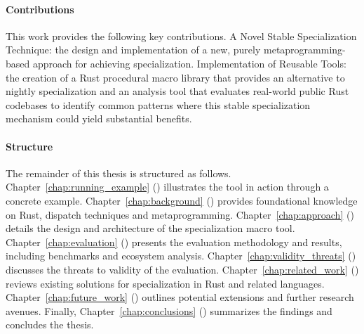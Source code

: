 \paragraph{Contributions}
This work provides the following key contributions.
A Novel Stable Specialization Technique: the design and implementation of a new, purely metaprogramming-based approach for achieving specialization.
Implementation of Reusable Tools: the creation of a Rust procedural macro library that provides an alternative to nightly specialization and an analysis tool that evaluates real-world public Rust codebases to identify common patterns where this stable specialization mechanism could yield substantial benefits.

\paragraph{Structure}
The remainder of this thesis is structured as follows.
Chapter~\ref{chap:running_example} () illustrates the tool in action through a concrete example.
Chapter~\ref{chap:background} () provides foundational knowledge on Rust, dispatch techniques and metaprogramming.
Chapter~\ref{chap:approach} () details the design and architecture of the specialization macro tool.
Chapter~\ref{chap:evaluation} () presents the evaluation methodology and results, including benchmarks and ecosystem analysis.
Chapter~\ref{chap:validity_threats} () discusses the threats to validity of the evaluation.
Chapter~\ref{chap:related_work} () reviews existing solutions for specialization in Rust and related languages.
Chapter~\ref{chap:future_work} () outlines potential extensions and further research avenues.
Finally, Chapter~\ref{chap:conclusions} () summarizes the findings and concludes the thesis.
